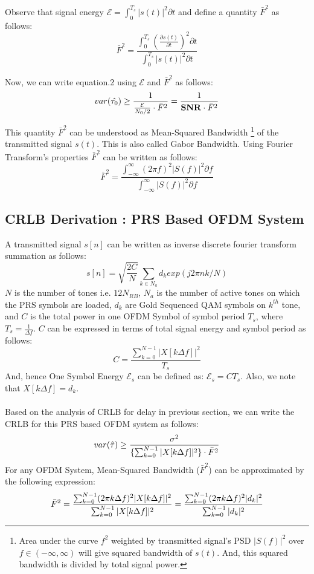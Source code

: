 \documentclass{article}
\begin{document}
Observe that signal energy $\mathcal E = \int^{T_s}_{0}|s(t)|^2\partial t$ and define a quantity $\bar{F}^2$ as follows:
$$\bar{F}^2 = \frac{\int^{T_s}_{0}(\frac{\partial s(t)}{\partial t})^2 \partial t}{\int^{T_s}_{0}|s(t)|^2\partial t}$$

Now, we can write equation.2 using $\mathcal E$ and $\bar{F}^2$ as follows:
\begin{equation} \label{eq3} \large
var(\hat{\tau_0}) \ge \frac{1}{\frac{\mathcal{E}}{N_0/2}\cdot \bar{F}^2} = \frac{1}{\mathbf{SNR} \cdot \bar{F}^2}
\end{equation}

This quantity $\bar{F}^2$ can be understood as Mean-Squared Bandwidth \footnote{Area under the curve $f^2$ weighted by transmitted signal's PSD $|S(f)|^2$ over $f \in (-\infty, \infty)$ will give squared bandwidth of $s(t)$. And, this squared bandwidth is divided by total signal power.} of the transmitted signal $s(t)$. This is also called Gabor Bandwidth. Using Fourier Transform's properties $\bar{F}^2$ can be written as follows:
$$\bar{F}^2 = \frac{\int^{\infty}_{-\infty}(2\pi f)^2|S(f)|^2\partial f}{\int^{\infty}_{-\infty}|S(f)|^2\partial f}$$

\subsection{CRLB Derivation : PRS Based OFDM System}
A transmitted signal $s[n]$ can be written as inverse discrete fourier transform summation as follows:
$$s[n] = \sqrt{\frac{2C}{N}} \sum_{k \in N_a}d_k exp(j2\pi n k/N)$$
$N$ is the number of tones i.e. $12N_{RB}$, $N_a$ is the number of active tones on which the PRS symbols are loaded, $d_k$ are Gold Sequenced QAM symbols on $k^{th}$ tone, and $C$ is the total power in one OFDM Symbol of symbol period $T_s$, where $T_s = \frac{1}{\Delta f}$. $C$ can be expressed in terms of total signal energy and symbol period as follows:
$$C = \frac{\sum^{N-1}_{k=0}|X[k\Delta f]|^2}{T_s}$$
And, hence One Symbol Energy $\mathcal E_s$ can be defined as: $\mathcal E_s = C T_s$. Also, we note that $X[k \Delta f] = d_k$.
\paragraph{}
Based on the analysis of CRLB for delay in previous section, we can write the CRLB for this PRS based OFDM system as follows:
\begin{equation} \label{eq4} \large
var(\hat{\tau}) \ge \frac{\sigma^2}{\{\sum^{N-1}_{k=0}|X[k\Delta f]|^2\}\cdot \bar{F}^2}
\end{equation}
For any OFDM System, Mean-Squared Bandwidth ($\bar{F}^2$) can be approximated by the following expression:
\begin{equation} \label{eq5} \large
\bar{F}^2 = \frac{\sum^{N-1}_{k=0}(2\pi k\Delta f)^2|X[k\Delta f]|^2}{\sum^{N-1}_{k=0}|X[k\Delta f]|^2} = \frac{\sum^{N-1}_{k=0}(2\pi k\Delta f)^2|d_k|^2}{\sum^{N-1}_{k=0}|d_k|^2}
\end{equation}
\end{document}
